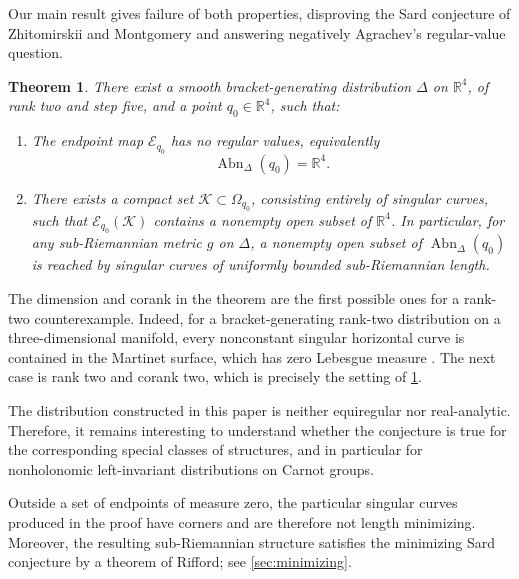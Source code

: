 \documentclass[11pt]{amsart}
\newtheorem{theorem}{Theorem}[section]
\numberwithin{equation}{section}
\theoremstyle{remark}
\newcommand{\R}{\mathbb R}
\newcommand{\Abn}{\operatorname{Abn}}
\begin{document}
Our main result gives failure of
both properties, disproving the Sard conjecture of Zhitomirskii and
Montgomery and answering negatively Agrachev's regular-value question.

\begin{theorem}\label{thm:main}
There exist a smooth bracket-generating distribution $\Delta$ on
$\R^4$, of rank two and
step five, and a point $q_0\in\R^4$, such that:
\begin{enumerate}
 \item The endpoint map $\mathcal E_{q_0}$ has no regular
 values, equivalently
 \begin{equation}
  \Abn_\Delta(q_0)=\R^4.
 \end{equation}
 \item There exists a compact set $ \mathcal K\subset\Omega_{q_0}$, consisting entirely of singular curves, such that
 $\mathcal E_{q_0}(\mathcal K)$ contains a nonempty open subset of
 $\R^4$.  In particular, for any sub-Riemannian metric $g$ on $\Delta$, a nonempty open subset of
 $\Abn_\Delta(q_0)$ is reached by singular curves of uniformly bounded
 sub-Riemannian length.
\end{enumerate}
\end{theorem}

The dimension and corank in the theorem are the first possible ones
for a rank-two counterexample.  Indeed, for a bracket-generating
rank-two distribution on a three-dimensional manifold, every
nonconstant singular horizontal curve is contained in the Martinet
surface, which has zero Lebesgue measure
\cite[Section~1 and Appendix~A]{BdSR}. The next case is rank
two and corank two, which is precisely the setting of
\cref{thm:main}.

The distribution constructed in this paper is neither equiregular nor real-analytic.  Therefore, it remains interesting to understand whether the conjecture is true for the corresponding special classes of structures, and in particular for nonholonomic left-invariant distributions on Carnot groups.

Outside a set of endpoints of measure zero, the particular singular
curves produced in the proof have corners and are therefore not length
minimizing. Moreover, the resulting sub-Riemannian structure satisfies
the minimizing Sard conjecture by a theorem of Rifford; see
\cref{sec:minimizing}.
\end{document}

